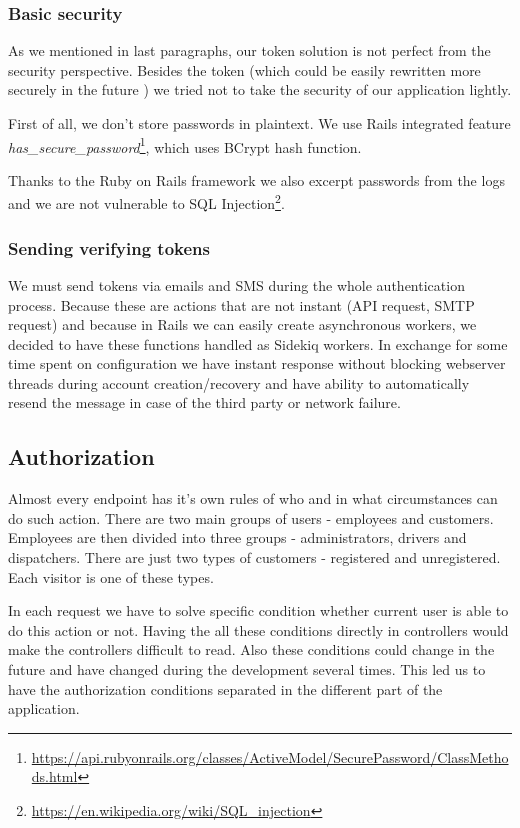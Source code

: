 \subsubsection{Basic security}
As we mentioned in last paragraphs, our token solution is not perfect from the security perspective. Besides the token (which could be easily rewritten more securely in the future ) we tried not to take the security of our application lightly.

First of all, we don't store passwords in plaintext. We use Rails integrated feature \textit{has\_secure\_password}\footnote{\url{https://api.rubyonrails.org/classes/ActiveModel/SecurePassword/ClassMethods.html}}, which uses BCrypt hash function.

Thanks to the Ruby on Rails framework we also excerpt passwords from the logs and we are not vulnerable to SQL Injection\footnote{\url{https://en.wikipedia.org/wiki/SQL\_injection}}.

\subsubsection{Sending verifying tokens}
We must send tokens via emails and SMS during the whole authentication process. Because these are actions that are not instant (API request, SMTP request) and because in Rails we can easily create asynchronous workers, we decided to have these functions handled as Sidekiq workers. In exchange for some time spent on configuration we have instant response without blocking webserver threads during account creation/recovery and have ability to automatically resend the message in case of the third party or network failure.

\subsection{Authorization}
Almost every endpoint has it's own rules of who and in what circumstances can do such action. There are two main groups of users - employees and customers. Employees are then divided into three groups - administrators, drivers and dispatchers. There are just two types of customers - registered and unregistered. Each visitor is one of these types.

In each request we have to solve specific condition whether current user is able to do this action or not. Having the all these conditions directly in controllers would make the controllers difficult to read. Also these conditions could change in the future and have changed during the development several times. This led us to have the authorization conditions separated in the different part of the application.

